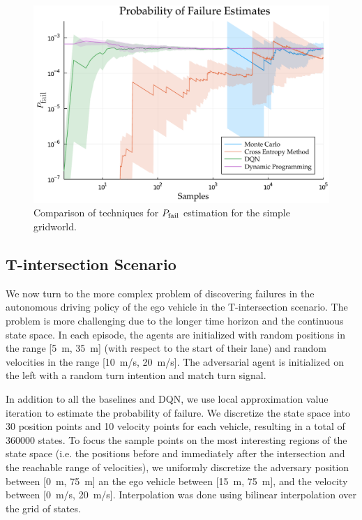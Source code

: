 \begin{figure}
        \centering
        \includegraphics[width=\textwidth]{figures/distribution_over_failures/pfail_gridworld.pdf}
        \caption{Comparison of techniques for $P_{\rm fail}$ estimation for the simple gridworld.}
        \label{fig:gridworld_pfail_vs_samples}
\end{figure}



\subsection{T-intersection Scenario}
We now turn to the more complex problem of discovering failures in the autonomous driving policy of the ego vehicle in the T-intersection scenario. The problem is more challenging due to the longer time horizon  and the continuous state space. In each episode, the agents are initialized with random positions in the range [\SI{5}{m}, \SI{35}{m}] (with respect to the start of their lane) and random velocities in the range [\SI{10}{m/s}, \SI{20}{m/s}]. The adversarial agent is initialized on the left with a random turn intention and match turn signal.

In addition to all the baselines and DQN, we use local approximation value iteration to estimate the probability of failure. We discretize the state space into \num{30} position points and \num{10} velocity points for each vehicle, resulting in a total of \num{360000} states. To focus the sample points on the most interesting regions of the state space (i.e. the positions before and immediately after the intersection and the reachable range of velocities), we uniformly discretize the adversary position between [\SI{0}{m}, \SI{75}{m}] an the ego vehicle between [\SI{15}{m}, \SI{75}{m}], and the velocity between [\SI{0}{m/s}, \SI{20}{m/s}]. Interpolation was done using bilinear interpolation over the grid of states. 


